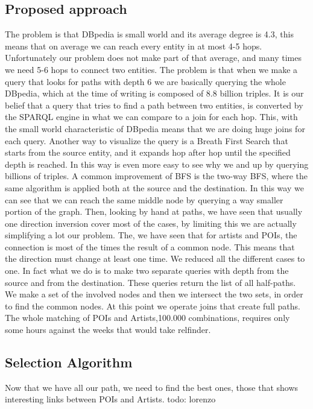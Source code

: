 \documentclass[paper=a4, fontsize=11pt]{scrartcl}
\begin{document}
\subsection{Proposed approach}
The problem is that DBpedia is small world and its average degree is 4.3, this means that on average we can reach every entity in at most 4-5 hops. Unfortunately our problem does not make part of that average, and many times we need 5-6 hops to connect two entities. The problem is that when we make a query that looks for paths with depth 6 we are basically querying the whole DBpedia, which at the time of writing is composed of 8.8 billion triples.
It is our belief that a query that tries to find a path between two entities, is converted by the SPARQL engine in what we can compare to a join for each hop. This, with the small world characteristic of DBpedia means that we are doing huge joins for each query.
Another way to visualize the query is a Breath First Search that starts from the source entity, and it expands hop after hop until the specified depth is reached. In this way is even more easy to see why we and up by querying billions of triples.
A common improvement of BFS is the two-way BFS, where the same algorithm is applied both at the source and the destination. In this way we can see that we can reach the same middle node by querying a way smaller portion of the graph.
Then, looking by hand at paths, we have seen that usually one direction inversion cover most of the cases, by limiting this we are actually simplifying a lot our problem. The, we have seen that for artists and POIs, the connection is most of the times the result of a common node. This means that the direction must change at least one time. We reduced all the different cases to one. In fact what we do is to make two separate queries with depth  from the source and from the destination. These queries return the list of all half-paths. We make a set of the involved nodes and then we intersect the two sets, in order to find the common nodes. At this point we operate joins that create full paths. The whole matching of POIs and Artists,100.000 combinations, requires only some hours against the weeks that would take relfinder.
\subsection{Selection Algorithm}
Now that we have all our path, we need to find the best ones, those that shows interesting links between POIs and Artists.
todo: lorenzo
\end{document}
